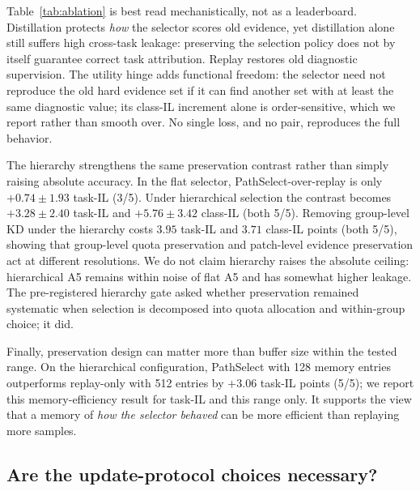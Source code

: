 \documentclass{article}
\begin{document}
Table~\ref{tab:ablation} is best read mechanistically, not as a leaderboard.
Distillation protects \emph{how} the selector scores old evidence, yet distillation alone still suffers high cross-task leakage: preserving the selection policy does not by itself guarantee correct task attribution.
Replay restores old diagnostic supervision.
The utility hinge adds functional freedom: the selector need not reproduce the old hard evidence set if it can find another set with at least the same diagnostic value; its class-IL increment alone is order-sensitive, which we report rather than smooth over.
No single loss, and no pair, reproduces the full behavior.

The hierarchy strengthens the same preservation contrast rather than simply raising absolute accuracy.
In the flat selector, PathSelect-over-replay is only $+0.74{\pm}1.93$ task-IL (3/5).
Under hierarchical selection the contrast becomes $+3.28{\pm}2.40$ task-IL and $+5.76{\pm}3.42$ class-IL (both 5/5).
Removing group-level KD under the hierarchy costs $3.95$ task-IL and $3.71$ class-IL points (both 5/5), showing that group-level quota preservation and patch-level evidence preservation act at different resolutions.
We do not claim hierarchy raises the absolute ceiling: hierarchical A5 remains within noise of flat A5 and has somewhat higher leakage.
The pre-registered hierarchy gate asked whether preservation remained systematic when selection is decomposed into quota allocation and within-group choice; it did.

Finally, preservation design can matter more than buffer size within the tested range.
On the hierarchical configuration, PathSelect with 128 memory entries outperforms replay-only with 512 entries by $+3.06$ task-IL points (5/5); we report this memory-efficiency result for task-IL and this range only.
It supports the view that a memory of \emph{how the selector behaved} can be more efficient than replaying more samples.


\subsection{Are the update-protocol choices necessary?}
\label{ssec:protocols}
\end{document}
